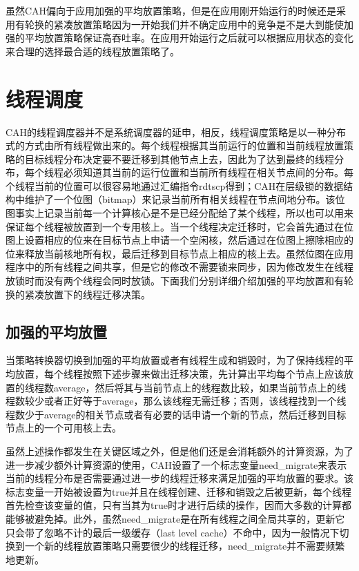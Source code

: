 虽然CAH偏向于应用加强的平均放置策略，但是在应用刚开始运行的时候还是采用有轮换的紧凑放置策略因为一开始我们并不确定应用中的竞争是不是大到能使加强的平均放置策略保证高吞吐率。在应用开始运行之后就可以根据应用状态的变化来合理的选择最合适的线程放置策略了。

\section{线程调度}
CAH的线程调度器并不是系统调度器的延申，相反，线程调度策略是以一种分布式的方式由所有线程做出来的。每个线程根据其当前运行的位置和当前线程放置策略的目标线程分布决定要不要迁移到其他节点上去，因此为了达到最终的线程分布，每个线程必须知道其当前的运行位置和当前所有线程在相关节点间的分布。每个线程当前的位置可以很容易地通过汇编指令rdtscp得到；CAH在层级锁的数据结构中维护了一个位图（bitmap）来记录当前所有相关线程在节点间地分布。该位图事实上记录当前每一个计算核心是不是已经分配给了某个线程，所以也可以用来保证每个线程被放置到一个专用核上。当一个线程决定迁移时，它会首先通过在位图上设置相应的位来在目标节点上申请一个空闲核，然后通过在位图上擦除相应的位来释放当前核地所有权，最后迁移到目标节点上相应的核上去。虽然位图在应用程序中的所有线程之间共享，但是它的修改不需要锁来同步，因为修改发生在线程放锁时而没有两个线程会同时放锁。下面我们分别详细介绍加强的平均放置和有轮换的紧凑放置下的线程迁移决策。

\subsection{加强的平均放置}
当策略转换器切换到加强的平均放置或者有线程生成和销毁时，为了保持线程的平均放置，每个线程按照下述步骤来做出迁移决策，先计算出平均每个节点上应该放置的线程数average，然后将其与当前节点上的线程数比较，如果当前节点上的线程数较少或者正好等于average，那么该线程无需迁移；否则，该线程找到一个线程数少于average的相关节点或者有必要的话申请一个新的节点，然后迁移到目标节点上的一个可用核上去。

虽然上述操作都发生在关键区域之外，但是他们还是会消耗额外的计算资源，为了进一步减少额外计算资源的使用，CAH设置了一个标志变量need\_migrate来表示当前的线程分布是否需要通过进一步的线程迁移来满足加强的平均放置的要求。该标志变量一开始被设置为true并且在线程创建、迁移和销毁之后被更新，每个线程首先检查该变量的值，只有当其为true时才进行后续的操作，因而大多数的计算都能够被避免掉。此外，虽然need\_migrate是在所有线程之间全局共享的，更新它只会带了忽略不计的最后一级缓存（last level cache）不命中，因为一般情况下切换到一个新的线程放置策略只需要很少的线程迁移，need\_migrate并不需要频繁地更新。
